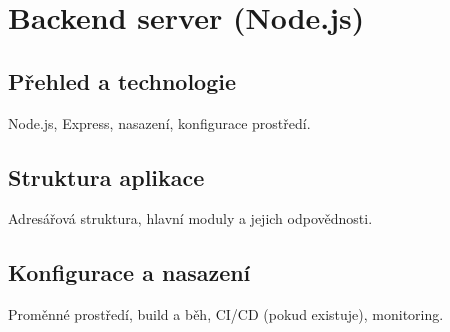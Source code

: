 \chapter{Backend server (Node.js)}
\label{chap:server}

\section{Přehled a technologie}
Node.js, Express, nasazení, konfigurace prostředí.

\section{Struktura aplikace}
Adresářová struktura, hlavní moduly a jejich odpovědnosti.

\section{Konfigurace a nasazení}
Proměnné prostředí, build a běh, CI/CD (pokud existuje), monitoring.
